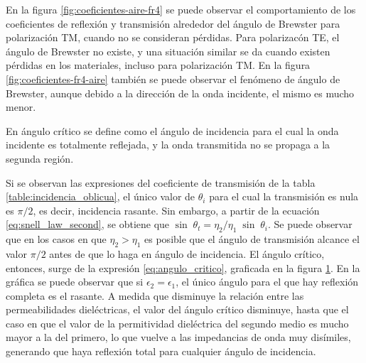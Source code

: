 \begin{figure} [H]
	\centering 
	\caption{}
	\label{fig:angulo-critico-epsilon}
\end{figure}

En la figura  \ref{fig:coeficientes-aire-fr4} se puede observar el comportamiento de los coeficientes de reflexión y transmisión alrededor del ángulo de Brewster para polarización TM, cuando no se consideran pérdidas. Para polarizacón TE, el ángulo de Brewster no existe, y una situación similar se da cuando existen pérdidas en los materiales, incluso para polarización TM. En la figura \ref{fig:coeficientes-fr4-aire} también se puede observar el fenómeno de ángulo de Brewster, aunque debido a la dirección de la onda incidente, el mismo es mucho menor.


En ángulo crítico se define como el ángulo de incidencia para el cual la onda incidente es totalmente reflejada, y la onda transmitida no se propaga a la segunda región.

Si se observan las expresiones del coeficiente de transmisión de la tabla \ref{table:incidencia_oblicua}, el único valor de $\theta_i$ para el cual la transmisión es nula es $\pi/2$, es decir, incidencia rasante. Sin embargo, a partir de la ecuación \ref{eq:snell_law_second}, se obtiene que $\sin \; \theta_t = \eta_2 / \eta_1\; \sin\; \theta_i$. Se puede observar que en los casos en que $\eta_2 > \eta_1$ es posible que el ángulo de transmisión alcance el valor $\pi/2$ antes de que lo haga en ángulo de incidencia. El ángulo crítico, entonces, surge de la expresión \ref{eq:angulo_critico}, graficada en la figura \ref{fig:angulo-critico-epsilon}. En la gráfica se puede observar que si $\epsilon_2 = \epsilon_1$, el único ángulo para el que hay reflexión completa es el rasante. A medida que disminuye la relación entre las permeabilidades dieléctricas, el valor del ángulo crítico disminuye, hasta que el caso en que el valor de la permitividad dieléctrica del segundo medio es mucho mayor a la del primero, lo que vuelve a las impedancias de onda muy disímiles, generando que haya reflexión total para cualquier ángulo de incidencia.

